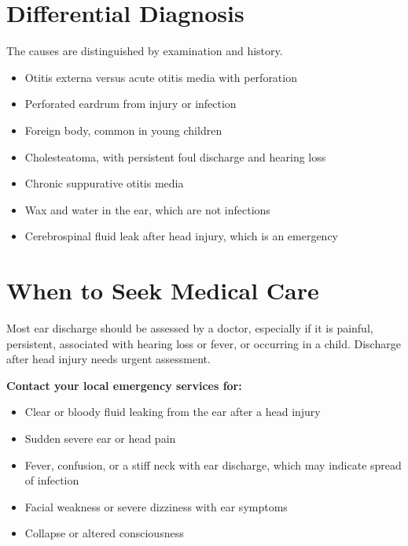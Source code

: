 \section*{Differential Diagnosis}
The causes are distinguished by examination and history.
\begin{itemize}
    \item Otitis externa versus acute otitis media with perforation
    \item Perforated eardrum from injury or infection
    \item Foreign body, common in young children
    \item Cholesteatoma, with persistent foul discharge and hearing loss
    \item Chronic suppurative otitis media
    \item Wax and water in the ear, which are not infections
    \item Cerebrospinal fluid leak after head injury, which is an emergency
\end{itemize}

\section*{When to Seek Medical Care}
Most ear discharge should be assessed by a doctor, especially if it is painful, persistent, associated with hearing loss or fever, or occurring in a child. Discharge after head injury needs urgent assessment.

\textbf{Contact your local emergency services for:}
\begin{itemize}
    \item Clear or bloody fluid leaking from the ear after a head injury
    \item Sudden severe ear or head pain
    \item Fever, confusion, or a stiff neck with ear discharge, which may indicate spread of infection
    \item Facial weakness or severe dizziness with ear symptoms
    \item Collapse or altered consciousness
\end{itemize}

